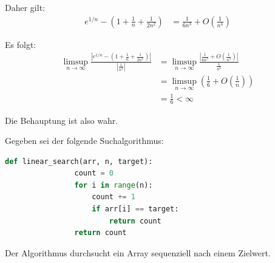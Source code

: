 \begin{questions}
\begin{parts}
\begin{solution}
        Daher gilt:
        \begin{align*}
        e^{1/n} - \left(1 + \frac{1}{n} + \frac{1}{2n^2}\right) &= \frac{1}{6n^3} + O\left(\frac{1}{n^4}\right)
        \end{align*}

        Es folgt:
        \begin{align*}
        \limsup_{n\to\infty}\frac{\left|e^{1/n} - \left(1 + \frac{1}{n} + \frac{1}{2n^2}\right)\right|}{\left|\frac{1}{n^3}\right|} &= \limsup_{n\to\infty}\frac{\left|\frac{1}{6n^3} + O\left(\frac{1}{n^4}\right)\right|}{\frac{1}{n^3}} \\
        &= \limsup_{n\to\infty}\left(\frac{1}{6} + O\left(\frac{1}{n}\right)\right) \\
        &= \frac{1}{6} < \infty
        \end{align*}

        Die Behauptung ist also wahr.
		\end{solution}
		\droptotalpoints
	\end{parts}

        \question Gegeben sei der folgende Suchalgorithmus:
            \begin{lstlisting}[language=Python]
            def linear_search(arr, n, target):
                count = 0
                for i in range(n):
                    count += 1
                    if arr[i] == target:
                        return count
                return count
            \end{lstlisting}
        Der Algorithmus durchsucht ein Array sequenziell nach einem Zielwert.
         \droptotalpoints


\end{questions}
